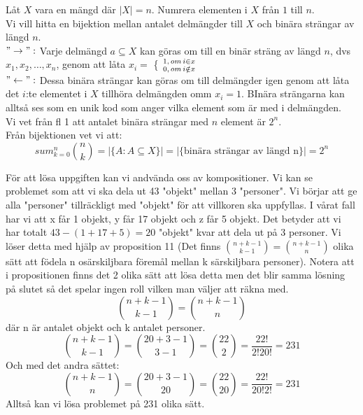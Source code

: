 \documentclass[nobib]{tufte-handout}
\begin{document}
\begin{xca}
Låt $X$ vara en mängd där $|X|=n$. Numrera elementen i $X$ från $1$ till $n$.\\

Vi vill hitta en bijektion mellan antalet delmängder till $X$ och binära strängar av längd $n$.\\
$"\rightarrow": $ Varje delmängd $ a\subseteq X $ kan göras om till en binär sträng av längd $n$, dvs $x_1,x_2,\ldots , x_n$, genom att låta $x_i=$ \Big \{ ${1,\, om \, i\in x \atop 0, \, om\, i \notin x}$ \\
$"\leftarrow": $ Dessa binära strängar kan göras om till delmängder igen genom att låta det $i$:te elementet i $X$ tillhöra delmängden omm $x_i=1$. BInära strängarna kan alltså ses som en unik kod som anger vilka element som är med i delmängden.\\

Vi vet från fl 1 att antalet binära strängar med $n$ element är $2^n$.\\
Från bijektionen vet vi att: $$sum_{k=0}^n\binom{n}{k}=|\{A:A\subseteq X\}|=|\{\text{binära strängar av längd n}\}|=2^n$$
\end{xca}


\begin{xca}
För att lösa uppgiften kan vi andvända oss av kompositioner. Vi kan se problemet som att vi ska dela ut 43 "objekt" mellan 3 "personer". Vi börjar att ge alla "personer" tillräckligt med "objekt" för att villkoren ska uppfyllas. I vårat fall har vi att x får 1 objekt, y får 17 objekt och z får 5 objekt. Det betyder att vi har totalt $43-(1+17+5)= 20$ "objekt" kvar att dela ut på 3 personer. Vi löser detta med hjälp av proposition 11 (Det finns $\binom{n+k-1}{k-1}=\binom{n+k-1}{n}$ olika sätt att födela n osärskiljbara föremål mellan k särskiljbara personer). Notera att i propositionen finns det 2 olika sätt att lösa detta men det blir samma lösning på slutet så det spelar ingen roll vilken man väljer att räkna med.
$$\binom{n+k-1}{k-1}=\binom{n+k-1}{n}$$ där n är antalet objekt och k antalet personer.
$$\binom{n+k-1}{k-1}=\binom{20+3-1}{3-1}= \binom{22}{2}=\frac{22!}{2!20!}=231$$
Och med det andra sättet:
$$\binom{n+k-1}{n}=\binom{20+3-1}{20}= \binom{22}{20}=\frac{22!}{20!2!}=231$$
Alltså kan vi lösa problemet på 231 olika sätt.
\end{xca}
\end{document}
